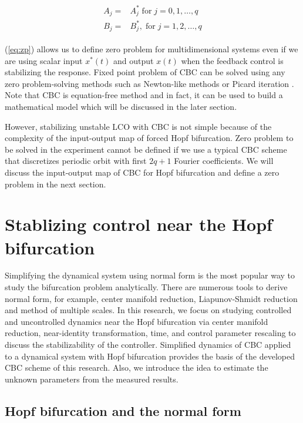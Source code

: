 \documentclass[openacc]{rsproca_new}%
\newcommand{\Eref}[1]{(\ref{#1})}
\begin{document}
\begin{align}\label{eq:zp}
  \begin{split}
  A_j=&A^*_j \; \textrm{for} \; j=0,1,\ldots,q\\
  B_j=&B^*_j,\; \textrm{for} \; j=1,2,\ldots,q
\end{split}
\end{align}

\noindent \Eref{eq:zp} allows us to define zero problem for multidimensional systems even if we are using scalar input $x^*(t)$ and output $x(t)$ when the feedback control is stabilizing the response. Fixed point problem of CBC can be solved using any zero problem-solving methods such as Newton-like methods \cite{schilder2015experimental} or Picard iteration \cite{barton2013systematic}. Note that CBC is equation-free method and in fact, it can be used to build a mathematical model which will be discussed in the later section.

However, stabilizing unstable LCO with CBC is not simple because of the complexity of the input-output map of forced Hopf bifurcation. Zero problem to be solved in the experiment cannot be defined if we use a typical CBC scheme that discretizes periodic orbit with first $2q+1$ Fourier coefficients. We will discuss the input-output map of CBC for Hopf bifurcation and define a zero problem in the next section.

\section{Stablizing control near the Hopf bifurcation}\label{SNH}

Simplifying the dynamical system using normal form is the most popular way to study the bifurcation problem analytically. There are numerous tools to derive normal form, for example, center manifold reduction, Liapunov-Shmidt reduction and method of multiple scales. In this research, we focus on studying controlled and uncontrolled dynamics near the Hopf bifurcation via center manifold reduction, near-identity transformation, time, and control parameter rescaling to discuss the stabilizability of the controller. Simplified dynamics of CBC applied to a dynamical system with Hopf bifurcation provides the basis of the developed CBC scheme of this research. Also, we introduce the idea to estimate the unknown parameters from the measured results.

\subsection{Hopf bifurcation and the normal form}\label{SNF}
\end{document}
